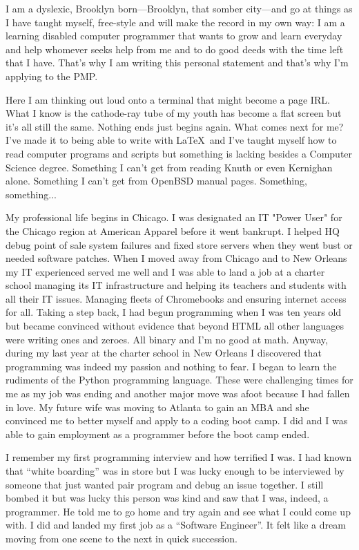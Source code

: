 \documentclass{report}
\begin{document}
I am a dyslexic, Brooklyn born---Brooklyn, that somber city---and go at things as I have taught myself, free-style and will make the record in my own way: I am a learning disabled computer programmer that wants to grow and learn everyday and help whomever seeks help from me and to do good deeds with the time left that I have. That's why I am writing this personal statement and that's why I'm applying to the PMP.

Here I am thinking out loud onto a terminal that might become a page IRL. What I know is the cathode-ray tube of my youth has become a flat screen but it's all still the same. Nothing ends just begins again. What comes next for me? I've made it to being able to write with \LaTeX\ and I've taught myself how to read computer programs and scripts but something is lacking besides a Computer Science degree. Something I can't get from reading Knuth or even Kernighan alone. Something I can't get from OpenBSD manual pages. Something, something...

My professional life begins in Chicago. I was designated an IT "Power User" for the Chicago region at American Apparel before it went bankrupt. I helped HQ debug point of sale system failures and fixed store servers when they went bust or needed software patches. When I moved away from Chicago and to New Orleans my IT experienced served me well and I was able to land a job at a charter school managing its IT infrastructure and helping its teachers and students with all their IT issues. Managing fleets of Chromebooks and ensuring internet access for all. Taking a step back, I had begun programming when I was ten years old but became convinced without evidence that beyond HTML  all other languages were writing ones and zeroes. All binary and I'm no good at math. Anyway, during my last year at the charter school in New Orleans I discovered that programming was indeed my passion and nothing to fear. I began to learn the rudiments of the Python programming language. These were challenging times for me as my job was ending and another major move was afoot because I had fallen in love. My future wife was moving to Atlanta to gain an MBA and she convinced me to better myself and apply to a coding boot camp. I did and I was able to gain employment as a programmer before the boot camp ended.

I remember my first programming interview and how terrified I was. I had known that ``white boarding'' was in store but I was lucky enough to be interviewed by someone that just wanted pair program and debug an issue together. I still bombed it but was lucky this person was kind and saw that I was, indeed, a programmer. He told me to go home and try again and see what I could come up with. I did and landed my first job as a ``Software Engineer''. It felt like a dream moving from one scene to the next in quick succession.
\end{document}
